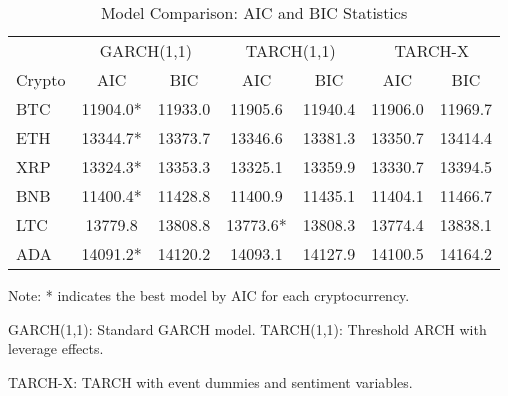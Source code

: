 
\begin{table}[htbp]
\centering
\caption{Model Comparison: AIC and BIC Statistics}
\label{tab:model_comparison}
\begin{tabular}{lcccccc}
\hline
\hline
 & \multicolumn{2}{c}{GARCH(1,1)} & \multicolumn{2}{c}{TARCH(1,1)} & \multicolumn{2}{c}{TARCH-X} \\
\cmidrule(lr){2-3} \cmidrule(lr){4-5} \cmidrule(lr){6-7}
Crypto & AIC & BIC & AIC & BIC & AIC & BIC \\
\hline
BTC & 11904.0* & 11933.0 & 11905.6 & 11940.4 & 11906.0 & 11969.7 \\
ETH & 13344.7* & 13373.7 & 13346.6 & 13381.3 & 13350.7 & 13414.4 \\
XRP & 13324.3* & 13353.3 & 13325.1 & 13359.9 & 13330.7 & 13394.5 \\
BNB & 11400.4* & 11428.8 & 11400.9 & 11435.1 & 11404.1 & 11466.7 \\
LTC & 13779.8 & 13808.8 & 13773.6* & 13808.3 & 13774.4 & 13838.1 \\
ADA & 14091.2* & 14120.2 & 14093.1 & 14127.9 & 14100.5 & 14164.2 \\
\hline
\hline
\end{tabular}
\begin{tablenotes}
\small
\item Note: * indicates the best model by AIC for each cryptocurrency.
\item GARCH(1,1): Standard GARCH model. TARCH(1,1): Threshold ARCH with leverage effects.
\item TARCH-X: TARCH with event dummies and sentiment variables.
\end{tablenotes}
\end{table}
